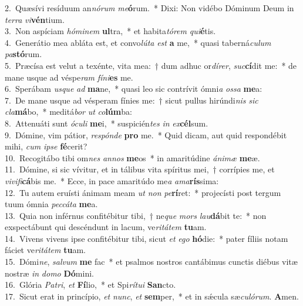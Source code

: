 {2.~}Quæsívi resíduum an\textit{nó}\textit{rum} \textit{me}\textbf{ó}rum.~* Dixi: Non vidébo Dóminum Deum in \textit{ter}\textit{ra} \textit{vi}\textbf{vén}tium.\\
{3.~}Non aspíciam \textit{hó}\textit{mi}\textit{nem} \textbf{ul}tra,~* et habita\textit{tó}\textit{rem} \textit{qui}\textbf{é}tis.\\
{4.~}Generátio mea abláta est, et convo\textit{lú}\textit{ta} \textit{est} \textbf{a} me,~* quasi taberná\textit{cu}\textit{lum} \textit{pa}\textbf{stó}rum.\\
{5.~}Præcísa est velut a texénte, vita mea:~† dum adhuc or\textit{dí}\textit{rer}, \textit{suc}\textbf{cí}dit me:~* de mane usque ad véspe\textit{ram} \textit{fí}\textit{ni}\textbf{es} me.\\
{6.~}Sperábam \textit{us}\textit{que} \textit{ad} \textbf{ma}ne,~* quasi leo sic contrívit ómni\textit{a} \textit{os}\textit{sa} \textbf{me}a:\\
{7.~}De mane usque ad vésperam fínies me:~† sicut pullus hirúndi\textit{nis} \textit{sic} \textit{cla}\textbf{má}bo,~* meditá\textit{bor} \textit{ut} \textit{co}\textbf{lúm}ba:\\
{8.~}Attenuáti sunt \textit{ó}\textit{cu}\textit{li} \textbf{me}i,~* suspicién\textit{tes} \textit{in} \textit{ex}\textbf{cél}sum.\\
{9.~}Dómine, vim pátior, \textit{re}\textit{spón}\textit{de} \textbf{pro} me.~* Quid dicam, aut quid respondébit mihi, \textit{cum} \textit{i}\textit{pse} \textbf{fé}cerit?\\
{10.~}Recogitábo tibi om\textit{nes} \textit{an}\textit{nos} \textbf{me}os~* in amaritúdine \textit{á}\textit{ni}\textit{mæ} \textbf{me}æ.\\
{11.~}Dómine, si sic vívitur, et in tálibus vita spíritus mei,~† corrípies me, et \textit{vi}\textit{vi}\textit{fi}\textbf{cá}bis me.~* Ecce, in pace amaritúdo me\textit{a} \textit{a}\textit{ma}\textbf{rís}sima:\\
{12.~}Tu autem eruísti ánimam meam \textit{ut} \textit{non} \textit{pe}\textbf{rí}ret:~* projecísti post tergum tuum ómnia \textit{pec}\textit{cá}\textit{ta} \textbf{me}a.\\
{13.~}Quia non inférnus confitébitur tibi,~† ne\textit{que} \textit{mors} \textit{lau}\textbf{dá}bit te:~* non exspectábunt qui descéndunt in lacum, ve\textit{ri}\textit{tá}\textit{tem} \textbf{tu}am.\\
{14.~}Vivens vivens ipse confitébitur tibi, sicut \textit{et} \textit{e}\textit{go} \textbf{hó}die:~* pater fíliis notam fáciet ve\textit{ri}\textit{tá}\textit{tem} \textbf{tu}am.\\
{15.~}Dómi\textit{ne}, \textit{sal}\textit{vum} \textbf{me} fac~* et psalmos nostros cantábimus cunctis diébus vitæ nostræ \textit{in} \textit{do}\textit{mo} \textbf{Dó}mini.\\
{16.~}Glória \textit{Pa}\textit{tri}, \textit{et} \textbf{Fí}lio,~* et Spi\textit{rí}\textit{tu}\textit{i} \textbf{San}cto.\\
{17.~}Sicut erat in princípio, \textit{et} \textit{nunc}, \textit{et} \textbf{sem}per,~* et in sǽcula sæ\textit{cu}\textit{ló}\textit{rum}. \textbf{A}men.\\
